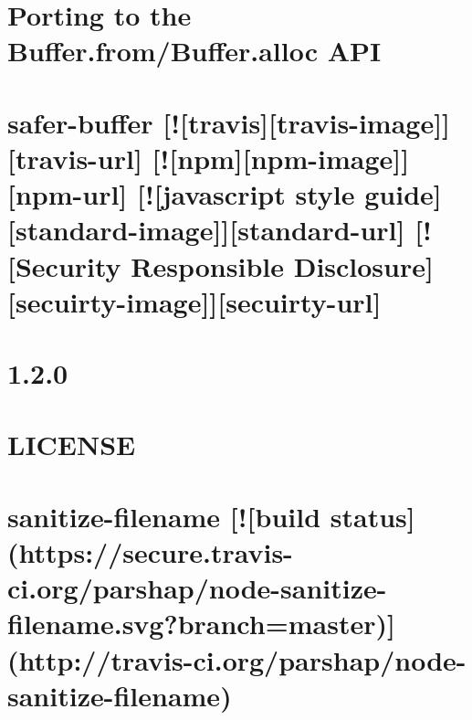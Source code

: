 \documentclass[twoside]{book}
\newcommand{\+}{\discretionary{\mbox{\scriptsize$\hookleftarrow$}}{}{}}
\begin{document}
\chapter{Porting to the Buffer.\+from/\+Buffer.alloc A\+PI}
\label{md_dsmacc_vis_degree_node_modules_safer-buffer_Porting-Buffer}

\chapter{safer-\/buffer \mbox{[}!\mbox{[}travis\mbox{]}\mbox{[}travis-\/image\mbox{]}\mbox{]}\mbox{[}travis-\/url\mbox{]} \mbox{[}!\mbox{[}npm\mbox{]}\mbox{[}npm-\/image\mbox{]}\mbox{]}\mbox{[}npm-\/url\mbox{]} \mbox{[}!\mbox{[}javascript style guide\mbox{]}\mbox{[}standard-\/image\mbox{]}\mbox{]}\mbox{[}standard-\/url\mbox{]} \mbox{[}!\mbox{[}Security Responsible Disclosure\mbox{]}\mbox{[}secuirty-\/image\mbox{]}\mbox{]}\mbox{[}secuirty-\/url\mbox{]}}
\label{md_dsmacc_vis_degree_node_modules_safer-buffer_Readme}

\chapter{1.2.0}
\label{md_dsmacc_vis_degree_node_modules_sanitize-filename_Changelog}

\chapter{L\+I\+C\+E\+N\+SE}
\label{md_dsmacc_vis_degree_node_modules_sanitize-filename_LICENSE}

\chapter{sanitize-\/filename \mbox{[}!\mbox{[}build status\mbox{]}(https\+://secure.travis-\/ci.org/parshap/node-\/sanitize-\/filename.svg?branch=master)\mbox{]}(http\+://travis-\/ci.org/parshap/node-\/sanitize-\/filename)}
\label{md_dsmacc_vis_degree_node_modules_sanitize-filename_README}

\end{document}
